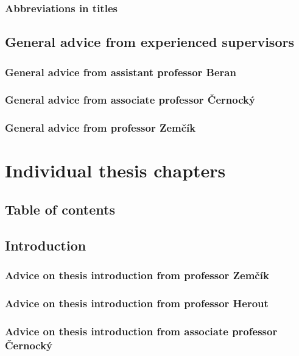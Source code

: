\subsection*{Abbreviations in titles}

\section{General advice from experienced supervisors}

\subsection*{General advice from assistant professor Beran}

\subsection*{General advice from associate professor Černocký}

\subsection*{General advice from professor Zemčík}

\chapter{Individual thesis chapters}
\label{kapitoly}

\section{Table of contents}
\label{obsah}

\section{Introduction}
\label{uvod}

\subsection*{Advice on thesis introduction from professor Zemčík}

\subsection*{Advice on thesis introduction from professor Herout}

\subsection*{Advice on thesis introduction from associate professor Černocký}

